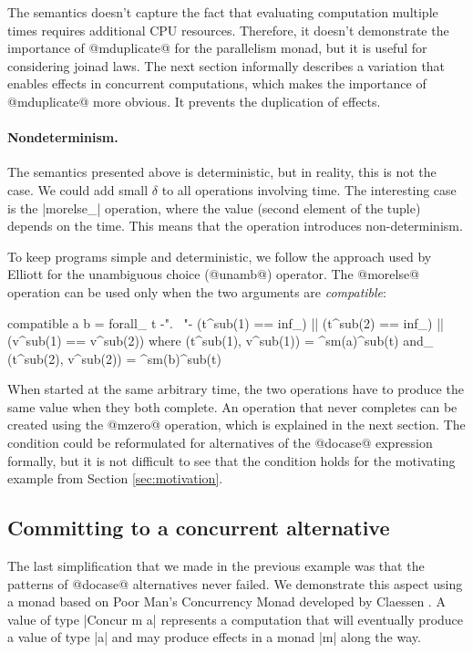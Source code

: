 \documentclass[preprint]{sigplanconf}
\begin{document}
The semantics doesn't capture the fact that evaluating computation multiple times requires 
additional CPU resources. Therefore, it doesn't demonstrate the importance of @mduplicate@ for
the parallelism monad, but it is useful for considering joinad laws. The next section
informally describes a variation that enables effects in concurrent computations, which makes
the importance of @mduplicate@ more obvious. It prevents the duplication of effects. 

\paragraph{Nondeterminism.} The semantics presented above is deterministic, but in reality, this 
is not the case. We could add small $\delta$ to all operations involving time. The interesting 
case is the |morelse_| operation, where the value (second element of the tuple) depends on the time.
This means that the operation introduces non-determinism.

To keep programs simple and deterministic, we follow the approach used by Elliott \cite{push-pull-frp} 
for the unambiguous choice (@unamb@) operator. The @morelse@ operation can be used only when the 
two arguments are \textit{compatible}:

\begin{code}
compatible a b = forall_ t {-". \ "-} (t^sub(1) == inf_) || (t^sub(2) == inf_) || (v^sub(1) == v^sub(2))
	where  (t^sub(1), v^sub(1)) = ^sm(a)^sub(t) and_ (t^sub(2), v^sub(2)) = ^sm(b)^sub(t)
\end{code}
When started at the same arbitrary time, the two operations have to produce the same value when they
both complete. An operation that never completes can be created using the @mzero@ operation, which 
is explained in the next section. The condition could be reformulated for alternatives of the @docase@
expression formally, but it is not difficult to see that the condition holds for the motivating 
example from Section \ref{sec:motivation}.


\subsection{Committing to a concurrent alternative}
\label{sec:intro-commit-poorman}

The last simplification that we made in the previous example was that the patterns of @docase@
alternatives never failed. We demonstrate this aspect using a monad based on Poor Man's Concurrency 
Monad developed by Claessen \cite{poorman}. A value of type |Concur m a| represents a computation 
that will eventually produce a value of type |a| and may produce effects in a monad |m| along the way. 
\end{document}
